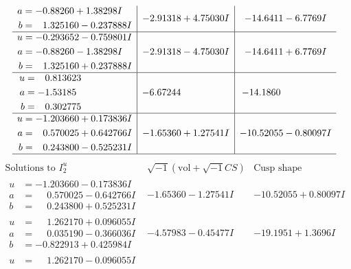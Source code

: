 \documentclass[1p]{elsarticle_modified}
\theoremstyle{definition}
\newcommand{\I}{\sqrt{-1}}
\begin{document}
$$\begin{array}{c|c|c}
\begin{aligned}
a &= -0.88260 + 1.38298 I \\
b &= \phantom{-}1.325160 - 0.237888 I\end{aligned}
 & -2.91318 + 4.75030 I & -14.6411 - 6.7769 I \\ \hline\begin{aligned}
u &= -0.293652 - 0.759801 I \\
a &= -0.88260 - 1.38298 I \\
b &= \phantom{-}1.325160 + 0.237888 I\end{aligned}
 & -2.91318 - 4.75030 I & -14.6411 + 6.7769 I \\ \hline\begin{aligned}
u &= \phantom{-}0.813623\phantom{ +0.000000I} \\
a &= -1.53185\phantom{ +0.000000I} \\
b &= \phantom{-}0.302775\phantom{ +0.000000I}\end{aligned}
 & -6.67244\phantom{ +0.000000I} & -14.1860\phantom{ +0.000000I} \\ \hline\begin{aligned}
u &= -1.203660 + 0.173836 I \\
a &= \phantom{-}0.570025 + 0.642766 I \\
b &= \phantom{-}0.243800 - 0.525231 I\end{aligned}
 & -1.65360 + 1.27541 I & -10.52055 - 0.80097 I\\
 \hline 
 \end{array}$$\newpage$$\begin{array}{c|c|c}  
\text{Solutions to }I^u_{2}& \I (\text{vol} + \sqrt{-1}CS) & \text{Cusp shape}\\
 \hline 
\begin{aligned}
u &= -1.203660 - 0.173836 I \\
a &= \phantom{-}0.570025 - 0.642766 I \\
b &= \phantom{-}0.243800 + 0.525231 I\end{aligned}
 & -1.65360 - 1.27541 I & -10.52055 + 0.80097 I \\ \hline\begin{aligned}
u &= \phantom{-}1.262170 + 0.096055 I \\
a &= \phantom{-}0.035190 - 0.366036 I \\
b &= -0.822913 + 0.425984 I\end{aligned}
 & -4.57983 - 0.45477 I & -19.1951 + 1.3696 I \\ \hline\begin{aligned}
u &= \phantom{-}1.262170 - 0.096055 I \\

\end{aligned}
\end{array}$$
\end{document}
